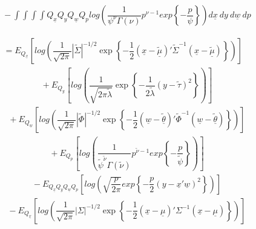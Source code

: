 \documentclass[fleqn]{minimal}
\begin{document}
\begin{align*}
  \ \ \ \ \ \ \ \ \ \
  - \int \int \int \int
  Q_{\underline{x}} Q_{y} Q_{\underline{w}} Q_{p}
  log \left(
    \dfrac{1}{\psi^{\nu} \Gamma(\nu)}
    p^{\nu-1}
    exp
    \left\{
      - \dfrac{p}{\psi}
    \right\}
  \right)
  d\underline{x} \ dy \ d\underline{w} \ dp
\end{align*}

\begin{align*}
  \ \ \ \ \ \
  = 
  E_{Q_{\underline{x}}} \left[
    log \left(
      \dfrac{1}{\sqrt{2\pi}}
      \left| \tilde{\Sigma} \right|^{-1/2}
      \exp
      \left\{
        - \dfrac{1}{2}
        \left( \underline{x} - \underline{\tilde{\mu}}\right)'
        \tilde{\Sigma}^{-1}
        \left( \underline{x} - \underline{\tilde{\mu}}\right)
      \right\}
    \right)
  \right]
\end{align*}
\begin{align*}
  \ \ \ \ \ \ \ \ \ \
  + 
  E_{Q_{y}} \left[
    log \left(
      \dfrac{1}{\sqrt{2\pi\tilde{\lambda}}}
      \exp
      \left\{
        - \dfrac{1}{2\tilde{\lambda}}
        \left(y - \tilde{\tau}\right)^2
      \right\}
    \right)
  \right]
\end{align*}
\begin{align*}
  \ \ \ \ \ \ \ \ \ \
  + 
  E_{Q_{\underline{w}}} \left[
    log \left(
      \dfrac{1}{\sqrt{2\pi}}
      \left| \tilde{\Phi} \right|^{-1/2}
      \exp
      \left\{
        - \dfrac{1}{2}
        \left( \underline{w} - \underline{\tilde{\theta}}\right)'
        \tilde{\Phi}^{-1}
        \left( \underline{w} - \underline{\tilde{\theta}}\right)
      \right\}
    \right)
  \right]
\end{align*}
\begin{align*}
  \ \ \ \ \ \ \ \ \ \
  + 
  E_{Q_{p}} \left[
    log \left(
      \dfrac{1}{\tilde{\psi}^{\tilde{\nu}} \Gamma(\tilde{\nu})}
      p^{\tilde{\nu}-1}
      exp
      \left\{
        - \dfrac{p}{\tilde{\psi}}
      \right\}
    \right)
  \right]
\end{align*}
\begin{align*}
  \ \ \ \ \ \ \ \ \ \
  - E_{Q_{\underline{x}} Q_{y} Q_{\underline{w}} Q_{p}}
  \left[
    log \left(
      \sqrt{\dfrac{p}{2\pi}}
      exp
      \left\{
        -\dfrac{p}{2}
        \left( y - \underline{x}'\underline{w}\right)^2
      \right\}
    \right)
  \right]
\end{align*}
\begin{align*}
  \ \ \ \ \ \ \ \ \ \
  - E_{Q_{\underline{x}}}
  \left[
    log \left(
      \dfrac{1}{\sqrt{2\pi}}
      \left| \Sigma \right|^{-1/2}
      \exp
      \left\{
        - \dfrac{1}{2}
        \left( \underline{x} - \underline{\mu}\right)'
        \Sigma^{-1}
        \left( \underline{x} - \underline{\mu}\right)
      \right\}
    \right)
  \right]
\end{align*}
\end{document}
